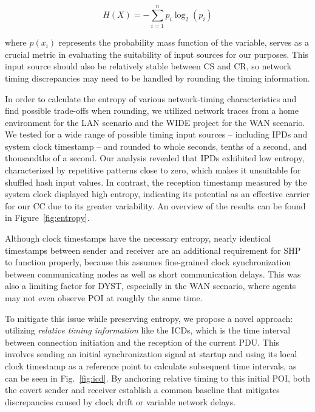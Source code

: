 \documentclass[journal]{IEEEtran}
\begin{document}
\begin{equation}
\label{eq:entropy}
H(X) = -\sum_{i=1}^{n} p_i \log_2(p_i)
\end{equation}

where $p(x_i)$ represents the probability mass function of the variable, serves as a crucial metric in evaluating the suitability of input sources for our purposes. This input source should also be relatively stable between \ac{CS} and \ac{CR}, so network timing discrepancies may need to be handled by rounding the timing information. 

In order to calculate the entropy of various network-timing characteristics and find possible trade-offs when rounding, we utilized network traces from a home environment for the LAN scenario and the WIDE project for the WAN scenario. We tested for a wide range of possible timing input sources -- including \ac{IPD}s and system clock timestamp -- and rounded to whole seconds, tenths of a second, and thousandths of a second. Our analysis revealed that \ac{IPD}s exhibited low entropy, characterized by repetitive patterns close to zero, which makes it unsuitable for shuffled hash input values. In contrast, the reception timestamp measured by the system clock displayed high entropy, indicating its potential as an effective carrier for our \ac{CC} due to its greater variability. An overview of the results can be found in Figure~\ref{fig:entropy}.

Although clock timestamps have the necessary entropy, nearly identical timestamps between sender and receiver are an additional requirement for \ac{SHP} to function properly, because this assumes fine-grained clock synchronization between communicating nodes as well as short communication delays. This was also a limiting factor for \ac{DYST}, especially in the WAN scenario, where agents may not even observe \ac{POI} at roughly the same time. 

To mitigate this issue while preserving entropy, we propose a novel approach: utilizing \emph{relative timing information} like the \ac{ICD}s, which is the time interval between connection initiation and the reception of the current \ac{PDU}. This involves sending an initial synchronization signal at startup and using its local clock timestamp as a reference point to calculate subsequent time intervals, as can be seen in Fig.~\ref{fig:icd}. By anchoring relative timing to this initial \ac{POI}, both the covert sender and receiver establish a common baseline that mitigates discrepancies caused by clock drift or variable network delays.
\end{document}
